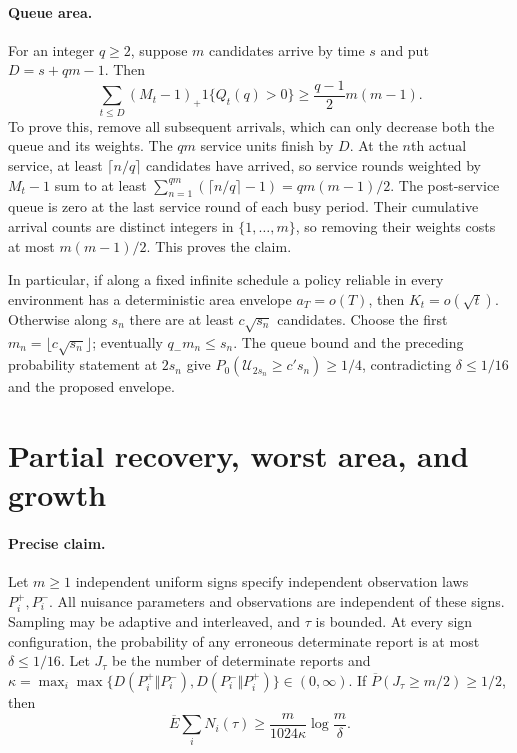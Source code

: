 \documentclass[11pt]{article}
\theoremstyle{remark}
\begin{document}
\paragraph{Queue area.}
For an integer $q\ge2$, suppose $m$ candidates arrive by time $s$ and put
$D=s+qm-1$. Then
\[
 \sum_{t\le D}(M_t-1)_+1\{Q_t(q)>0\}
 \ge\frac{q-1}{2}m(m-1).
\]
To prove this, remove all subsequent arrivals, which can only decrease both
the queue and its weights. The $qm$ service units finish by $D$. At the
$n$th actual service, at least $\lceil n/q\rceil$ candidates have arrived,
so service rounds weighted by $M_t-1$ sum to at least
$\sum_{n=1}^{qm}(\lceil n/q\rceil-1)=qm(m-1)/2$.
The post-service queue is zero at the last service round of each busy period.
Their cumulative arrival counts are distinct integers in $\{1,\ldots,m\}$,
so removing their weights costs at most $m(m-1)/2$. This proves the claim.

In particular, if along a fixed infinite schedule a policy reliable in every
environment has a deterministic area envelope $a_T=o(T)$, then
$K_t=o(\sqrt t)$. Otherwise along $s_n$ there are at least $c\sqrt{s_n}$
candidates. Choose the first $m_n=\lfloor c\sqrt{s_n}\rfloor$; eventually
$q_-m_n\le s_n$. The queue bound and the preceding probability statement at
$2s_n$ give $P_0(\mathcal U_{2s_n}\ge c's_n)\ge1/4$, contradicting
$\delta\le1/16$ and the proposed envelope.

\section{Partial recovery, worst area, and growth}
\label{app:partial}

\paragraph{Precise claim.}
Let $m\ge1$ independent uniform signs specify independent observation laws
$P_i^+,P_i^-$. All nuisance parameters and observations are independent of
these signs. Sampling may be adaptive and interleaved, and $\tau$ is bounded.
At every sign configuration, the probability of any erroneous determinate
report is at most $\delta\le1/16$. Let $J_\tau$ be the number of determinate
reports and
$\kappa=\max_i\max\{D(P_i^+\Vert P_i^-),D(P_i^-\Vert P_i^+)\}\in(0,\infty)$.
If $\overline P(J_\tau\ge m/2)\ge1/2$, then
\[
 \overline E\sum_iN_i(\tau)\ge\frac{m}{1024\kappa}\log\frac m\delta.
\]
\end{document}
